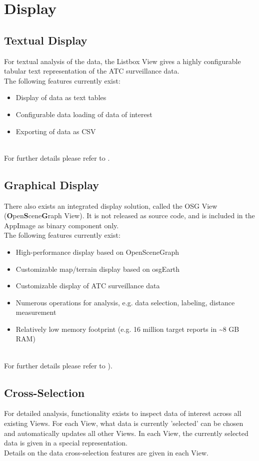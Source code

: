 \section{Display}

\subsection{Textual Display}

For textual analysis of the data, the Listbox View gives a highly configurable tabular text representation of the ATC surveillance data. \\

The following features currently exist:

\begin{itemize}  
\item Display of data as text tables
\item Configurable data loading of data of interest
\item Exporting of data as CSV
\end{itemize} 
\ \\

For further details please refer to .

\subsection{Graphical Display}
There also exists an integrated display solution, called the OSG View (\textbf{O}pen\textbf{S}cene\textbf{G}raph View). It is not released as source code, and is included in the AppImage as binary component only. \\

The following features currently exist:

\begin{itemize}  
\item High-performance display based on OpenSceneGraph
\item Customizable map/terrain display based on osgEarth
\item Customizable display of ATC surveillance data
\item Numerous operations for analysis, e.g. data selection, labeling, distance measurement
\item Relatively low memory footprint (e.g. 16 million target reports in \textasciitilde8 GB RAM)
\end{itemize} 
\ \\

For further details please refer to ).

\subsection{Cross-Selection}

For detailed analysis, functionality exists to inspect data of interest across all existing Views. For each View, what data is currently 'selected' can be chosen and automatically updates all other Views. In each View, the currently selected data is given in a special representation. \\

Details on the data cross-selection features are given in each View.
